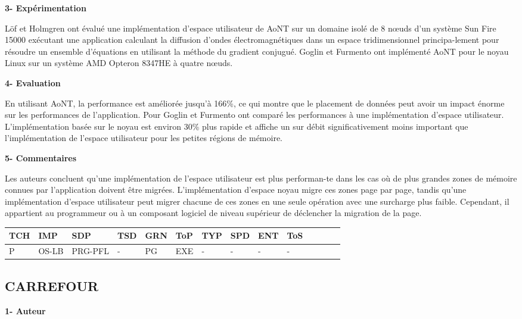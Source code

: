 \textbf{3- Expérimentation}

Löf et Holmgren \cite{HEN000} ont évalué une implémentation d'espace utilisateur de AoNT sur un domaine isolé de 8 nœuds d'un système Sun Fire 15000 exécutant une application calculant la diffusion d'ondes électromagnétiques dans un espace tridimensionnel principa-lement pour résoudre un ensemble d'équations en utilisant la méthode du gradient conjugué. Goglin et Furmento \cite{GF50} ont implémenté AoNT pour le noyau Linux sur un système AMD Opteron 8347HE à quatre nœuds.

\textbf{4- Evaluation}

En utilisant AoNT, la performance est améliorée jusqu'à 166\%, ce qui montre que le placement de données peut avoir un impact énorme sur les performances de l'application. 
Pour Goglin et Furmento \cite{GF50} ont comparé les performances à une implémentation d'espace utilisateur. 
L'implémentation basée sur le noyau est environ 30\% plus rapide et affiche un sur débit significativement moins important que l'implémentation de l'espace utilisateur pour les petites régions de mémoire. 

\textbf{5- Commentaires}

Les auteurs concluent qu'une implémentation de l'espace utilisateur est plus performan-te dans les cas où de plus grandes zones de mémoire connues par l'application doivent être migrées. 
L'implémentation d'espace noyau migre ces zones page par page, tandis qu'une implémentation d'espace utilisateur peut migrer chacune de ces zones en une seule opération avec une surcharge plus faible.
Cependant, il appartient au programmeur ou à un composant logiciel de niveau supérieur de déclencher la migration de la page. 
%
\begin{center}%
\begin{tabular}{l *{13}{l}} 		\hline
{TCH} & {IMP} 	& {SDP} 	&  {TSD} 	& {GRN} 	& {ToP} 	& {TYP} 	& {SPD}	& {ENT} 	& {ToS} \\     		\hline
P     	& OS-LB	& PRG-PFL	& - 		& PG		& EXE		& - 	  	& - 		& -    		& -\\     		          \hline
\end{tabular}
\end{center}
%
\subsection{CARREFOUR} 

\textbf{1- Auteur}

